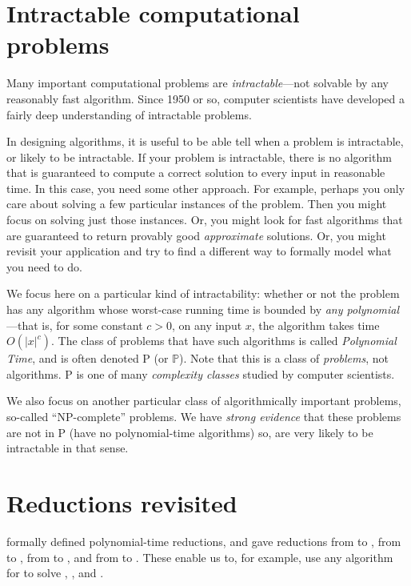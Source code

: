 \documentclass[11pt]{article}
\begin{document}

\newpage

\section{Intractable computational problems}\label{np: sec: intro}
Many important computational problems are \emph{intractable}---not solvable by any reasonably fast algorithm.
Since 1950 or so, computer scientists have developed
a fairly deep understanding of intractable problems.

In designing algorithms, it is useful to be able tell when a problem is intractable,
or likely to be intractable.
If your problem is intractable,
there is no algorithm that is guaranteed
to compute a correct solution to every input in reasonable time.
In this case, you need some other approach.
For example, perhaps you only care about solving a few particular instances
of the problem.  Then you might focus on solving just those instances.
Or, you might look for fast algorithms that are guaranteed to
return provably good \emph{approximate} solutions.
Or, you might revisit your application and try to
find a different way to formally model what you need to do.

We focus here on a particular kind of intractability:
whether or not the problem has any algorithm
whose worst-case running time is bounded by \emph{any polynomial}---that is, for some constant $c>0$, on any input $x$,
the algorithm takes time $O(|x|^c)$.
The class of problems that have such algorithms is called \emph{Polynomial Time},
and is often denoted P (or $\mathbb{P}$).
Note that this is a class of \emph{problems}, not algorithms.
P is one of many \emph{complexity classes} studied by computer scientists.

We also focus on another particular class of algorithmically important problems,
so-called ``NP-complete'' problems.
We have \emph{strong evidence} that these problems
are not in P
(have no polynomial-time algorithms)
so, are very likely to be intractable in that sense.

\section{Reductions revisited}\label{np: sec: reductions}
 formally defined polynomial-time reductions,
and gave reductions from  to ,
from  to ,
from  to ,
and from  to .
These enable us to, for example, use any algorithm for 
to solve , , and
.
\end{document}
